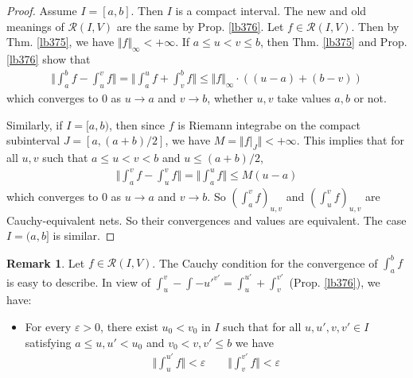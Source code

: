 \documentclass[12pt,b5paper,notitlepage]{article}
\theoremstyle{definition}
\newtheorem{rem}[df]{Remark}
\theoremstyle{plain}
\newcommand{\scr}{\mathscr}
\newcommand{\eps}{\varepsilon}
\numberwithin{equation}{section}
\begin{document}
\begin{proof}
Assume $I=[a,b]$. Then $I$ is a compact interval. The new and old meanings of $\scr R(I,V)$ are the same by Prop. \ref{lb376}. Let $f\in\scr R(I,V)$. Then by Thm. \ref{lb375}, we have $\Vert f\Vert_\infty<+\infty$. If $a\leq u<v\leq b$, then Thm. \ref{lb375} and Prop. \ref{lb376} show that
\begin{align*}
\Big\Vert \int_a^bf-\int_u^vf \Big\Vert=\Big\Vert \int_a^uf+\int_v^bf \Big\Vert\leq \Vert f\Vert_\infty\cdot((u-a)+(b-v))
\end{align*}
which converges to $0$ as $u\rightarrow a$ and $v\rightarrow b$, whether $u,v$ take values $a,b$ or not. 

Similarly, if $I=[a,b)$, then since $f$ is Riemann integrabe on the compact subinterval $J=[a,(a+b)/2]$, we have $M=\Vert f|_J\Vert<+\infty$. This implies that for all $u,v$ such that $a\leq u<v<b$ and $u\leq (a+b)/2$,
\begin{align*}
\Big\Vert \int_a^vf-\int_u^vf \Big\Vert=\Big\Vert \int_a^uf \Big\Vert\leq M(u-a)
\end{align*}
which converges to $0$ as $u\rightarrow a$ and $v\rightarrow b$. So $(\int_a^v f)_{u,v}$ and $(\int_u^vf)_{u,v}$ are Cauchy-equivalent nets. So their convergences and values are equivalent. The case $I=(a,b]$ is similar.
\end{proof}



\begin{rem}\label{lb418}
Let $f\in\scr R(I,V)$. The Cauchy condition for the convergence of $\int_a^bf$ is easy to describe. In view of $\int_u^v-\int-{u'}^{v'}=\int_u^{u'}+\int_v^{v'}$ (Prop. \ref{lb376}), we have:
\begin{itemize}
\item For every $\eps>0$, there exist $u_0<v_0$ in $I$ such that for all $u,u',v,v'\in I$ satisfying $a\leq u,u'<u_0$ and $v_0<v,v'\leq b$ we have
\begin{align*}
\Big\Vert\int_u^{u'}f\Big\Vert<\eps\qquad \Big\Vert \int_v^{v'}f\Big\Vert<\eps
\end{align*} 
\end{itemize}
\end{rem}
\end{document}
